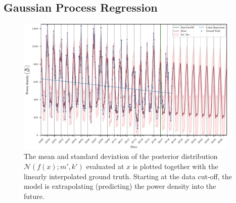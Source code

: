 \documentclass{article}
\theoremstyle{plain}
\theoremstyle{definition}
\theoremstyle{remark}
\begin{document}
\subsection{Gaussian Process Regression}
\begin{figure}[htb!]
    \centering
    \includegraphics[width=0.95\textwidth]{fig/gp_pred.pdf}
    \caption{The \textcolor{TUred}{mean} and \textcolor{TUred}{standard deviation} of the posterior distribution $\mathcal{N}(f(x); m', k')$ evaluated at $x$ is plotted together with the linearly interpolated \textcolor{TUdarkblue}{ground truth}. Starting at the \textcolor{TUdarkgreen}{data cut-off}, the model is extrapolating (predicting) the power density into the future.}
    \label{fig:gp-pred}
\end{figure}
\end{document}
